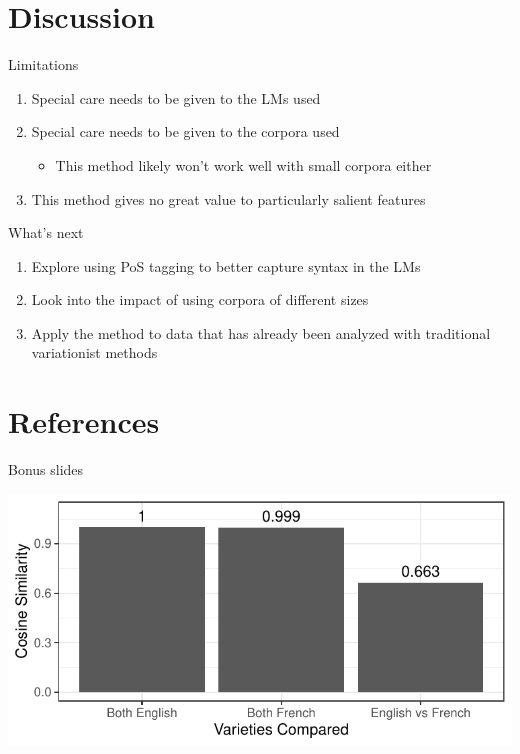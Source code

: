 \documentclass{beamer}\usepackage[]{graphicx}\usepackage[]{color}
\makeatletter
\def\maxwidth{ %
  \ifdim\Gin@nat@width>\linewidth
    \linewidth
  \else
    \Gin@nat@width
  \fi
}
\makeatother
\begin{document}
  \section{Discussion}
    \begin{frame}{Limitations}
      \begin{enumerate}
        \item Special care needs to be given to the LMs used
        \item Special care needs to be given to the corpora used
        \begin{itemize}
          \item This method likely won't work well with small corpora either
        \end{itemize}
        \item This method gives no great value to particularly salient features
      \end{enumerate}
    \end{frame}

    \begin{frame}{What's next}
      \begin{enumerate}
        \item Explore using PoS tagging to better capture syntax in the LMs
        \item Look into the impact of using corpora of different sizes
        \item Apply the method to data that has already been analyzed with traditional variationist methods
      \end{enumerate}
    \end{frame}

  \section{References}
    \printbibliography

    \begin{frame}{Bonus slides}
      \begin{center}

\includegraphics[width=\maxwidth]{figure/graphCosSimall-1} 

      \end{center}
    \end{frame}
\end{document}

